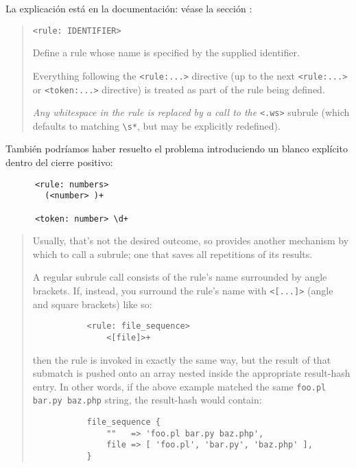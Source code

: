 La explicación está en la documentación: véase la sección :
\begin{it}\begin{quotation}
\verb|<rule: IDENTIFIER>|

    Define a rule whose name is specified by the supplied identifier.

Everything following the \verb|<rule:...>| directive (up to the next \verb|<rule:...>| or \verb|<token:...>| directive) 
is treated as part of the rule being defined.

\emph{Any whitespace in the rule is replaced by a call to the} \verb|<.ws>| subrule (which defaults to matching \verb|\s*|, but may be explicitly redefined).

\end{quotation}\end{it}
También podríamos haber resuelto el problema introduciendo un
blanco explícito dentro del cierre positivo:

\begin{verbatim}
      <rule: numbers>
        (<number> )+

      <token: number> \d+
\end{verbatim}


\begin{it}\begin{quotation}
Usually, that’s not the desired outcome, so  provides
another mechanism by which to call a subrule; one that saves all
repetitions of its results.

A regular subrule call consists of the rule’s name surrounded by angle
brackets. If, instead, you surround the rule’s name with  \verb"<[...]>"
(angle and square brackets) like so:

\begin{verbatim}
           <rule: file_sequence>
               <[file]>+
\end{verbatim}

then the rule is invoked in exactly the same way, but the result of that
submatch is pushed onto an array nested inside the appropriate result-hash
entry. In other words, if the above example matched the same  
\verb"foo.pl bar.py baz.php" string, the result-hash would contain:

\begin{verbatim}
           file_sequence {
               ""   => 'foo.pl bar.py baz.php',
               file => [ 'foo.pl', 'bar.py', 'baz.php' ],
           }
\end{verbatim}
\end{quotation}
\end{it}

